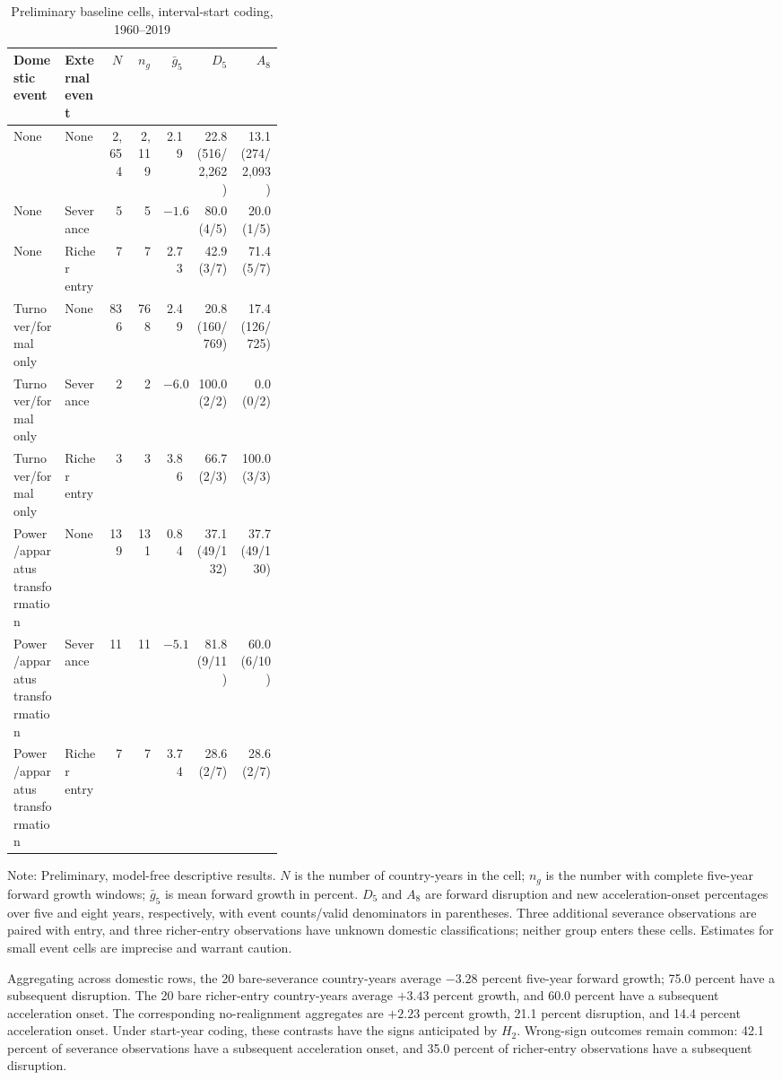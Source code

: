\documentclass[11pt]{article}
\begin{document}
\begin{table}[htbp]
\centering
\begin{threeparttable}
\caption{Preliminary baseline cells, interval-start coding, 1960--2019}
\label{tab:prelim_cells}
\scriptsize
\begin{tabular}{@{}p{0.19\linewidth}p{0.16\linewidth}rrrrr@{}}
\toprule
Domestic event & External event & $N$ & $n_g$ & $\bar g_{5}$ & $D_5$ & $A_8$ \\
\midrule
None & None & 2,654 & 2,119 & 2.19 & 22.8 (516/2,262) & 13.1 (274/2,093) \\
None & Severance & 5 & 5 & $-1.67$ & 80.0 (4/5) & 20.0 (1/5) \\
None & Richer entry & 7 & 7 & 2.73 & 42.9 (3/7) & 71.4 (5/7) \\
Turnover/formal only & None & 836 & 768 & 2.49 & 20.8 (160/769) & 17.4 (126/725) \\
Turnover/formal only & Severance & 2 & 2 & $-6.03$ & 100.0 (2/2) & 0.0 (0/2) \\
Turnover/formal only & Richer entry & 3 & 3 & 3.86 & 66.7 (2/3) & 100.0 (3/3) \\
Power/apparatus transformation & None & 139 & 131 & 0.84 & 37.1 (49/132) & 37.7 (49/130) \\
Power/apparatus transformation & Severance & 11 & 11 & $-5.10$ & 81.8 (9/11) & 60.0 (6/10) \\
Power/apparatus transformation & Richer entry & 7 & 7 & 3.74 & 28.6 (2/7) & 28.6 (2/7) \\
\bottomrule
\end{tabular}
\begin{tablenotes}
\scriptsize
\item Note: Preliminary, model-free descriptive results. $N$ is the number of country-years in the cell; $n_g$ is the number with complete five-year forward growth windows; $\bar g_5$ is mean forward growth in percent. $D_5$ and $A_8$ are forward disruption and new acceleration-onset percentages over five and eight years, respectively, with event counts/valid denominators in parentheses. Three additional severance observations are paired with entry, and three richer-entry observations have unknown domestic classifications; neither group enters these cells. Estimates for small event cells are imprecise and warrant caution.
\end{tablenotes}
\end{threeparttable}
\end{table}

Aggregating across domestic rows, the 20 bare-severance country-years average $-3.28$ percent five-year forward growth; 75.0 percent have a subsequent disruption. The 20 bare richer-entry country-years average $+3.43$ percent growth, and 60.0 percent have a subsequent acceleration onset. The corresponding no-realignment aggregates are $+2.23$ percent growth, 21.1 percent disruption, and 14.4 percent acceleration onset. Under start-year coding, these contrasts have the signs anticipated by $H_2$. Wrong-sign outcomes remain common: 42.1 percent of severance observations have a subsequent acceleration onset, and 35.0 percent of richer-entry observations have a subsequent disruption.
\end{document}
